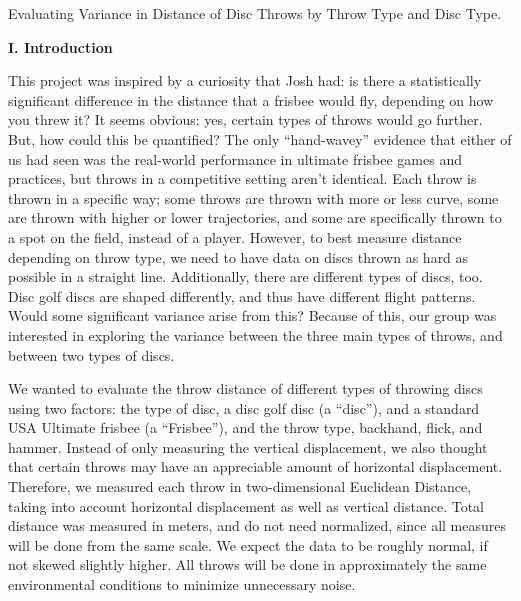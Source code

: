 \documentclass[letter,12pt]{article}
\begin{document}
	\begin{center}
		Evaluating Variance in Distance of Disc Throws by Throw Type and Disc Type.
	\end{center}
	\begin{center}
		\textbf{I. Introduction}
	\end{center}
	\justify
	This project was inspired by a curiosity that Josh had: is there a statistically significant difference in the distance that a frisbee would fly, depending on how you threw it? It seems obvious: yes, certain types of throws would go further. But, how could this be quantified? The only “hand-wavey” evidence that either of us had seen was the real-world performance in ultimate frisbee games and practices, but throws in a competitive setting aren’t identical. Each throw is thrown in a specific way; some throws are thrown with more or less curve, some are thrown with higher or lower trajectories, and some are specifically thrown to a spot on the field, instead of a player. However, to best measure distance depending on throw type, we need to have data on discs thrown as hard as possible in a straight line. Additionally, there are different types of discs, too. Disc golf discs are shaped differently, and thus have different flight patterns. Would some significant variance arise from this? Because of this, our group was interested in exploring the variance between the three main types of throws, and between two types of discs. \par
	We wanted to evaluate the throw distance of different types of throwing discs using two factors:  the type of disc, a disc golf disc (a “disc”), and a standard USA Ultimate frisbee (a “Frisbee”), and the throw type, backhand, flick, and hammer.  Instead of only measuring the vertical displacement, we also thought that certain throws may have an appreciable amount of horizontal displacement. Therefore, we measured each throw in two-dimensional Euclidean Distance, taking into account horizontal displacement as well as vertical distance. Total distance was measured in meters, and do not need normalized, since all measures will be done from the same scale. We expect the data to be roughly normal, if not skewed slightly higher. All throws will be done in approximately the same environmental conditions to minimize unnecessary noise. \par
\end{document}
